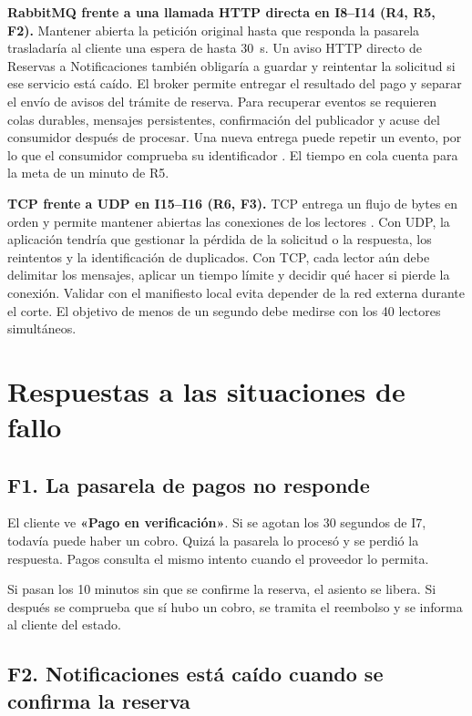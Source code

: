 \documentclass[11pt,a4paper]{article}
\begin{document}
\textbf{RabbitMQ frente a una llamada HTTP directa en I8--I14 (R4, R5, F2).}
Mantener abierta la petición original hasta que responda la pasarela trasladaría al cliente una espera de hasta 30~s. Un aviso HTTP directo de Reservas a Notificaciones también obligaría a guardar y reintentar la solicitud si ese servicio está caído. El broker permite entregar el resultado del pago y separar el envío de avisos del trámite de reserva. Para recuperar eventos se requieren colas durables, mensajes persistentes, confirmación del publicador y acuse del consumidor después de procesar. Una nueva entrega puede repetir un evento, por lo que el consumidor comprueba su identificador \cite{rabbit,confirms}. El tiempo en cola cuenta para la meta de un minuto de R5.

\textbf{TCP frente a UDP en I15--I16 (R6, F3).}
TCP entrega un flujo de bytes en orden y permite mantener abiertas las conexiones de los lectores \cite[sec. 2.2]{tcp}. Con UDP, la aplicación tendría que gestionar la pérdida de la solicitud o la respuesta, los reintentos y la identificación de duplicados. Con TCP, cada lector aún debe delimitar los mensajes, aplicar un tiempo límite y decidir qué hacer si pierde la conexión. Validar con el manifiesto local evita depender de la red externa durante el corte. El objetivo de menos de un segundo debe medirse con los 40 lectores simultáneos.

\section*{Respuestas a las situaciones de fallo}

\subsection*{F1. La pasarela de pagos no responde}

El cliente ve \textbf{«Pago en verificación»}. Si se agotan los 30 segundos de I7, todavía puede haber un cobro. Quizá la pasarela lo procesó y se perdió la respuesta. Pagos consulta el mismo intento cuando el proveedor lo permita.

Si pasan los 10 minutos sin que se confirme la reserva, el asiento se libera. Si después se comprueba que sí hubo un cobro, se tramita el reembolso y se informa al cliente del estado.

\subsection*{F2. Notificaciones está caído cuando se confirma la reserva}
\end{document}
